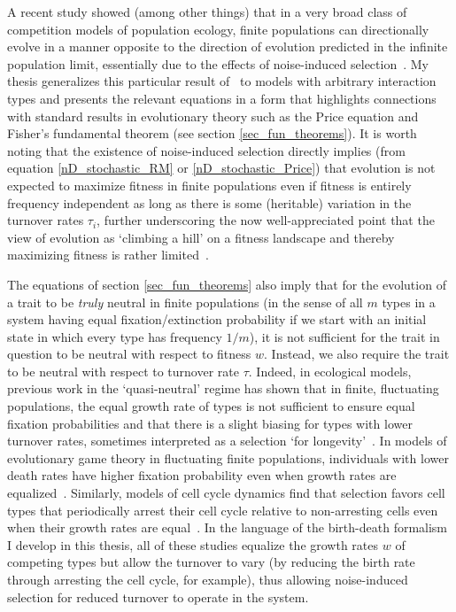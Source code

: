 A recent study showed (among other things) that in a very broad class of competition models of population ecology, finite populations can directionally evolve in a manner opposite to the direction of evolution predicted in the infinite population limit, essentially due to the effects of noise-induced selection~\citep{mazzolini_universality_2022}. My thesis generalizes this particular result of~\citet{mazzolini_universality_2022} to models with arbitrary interaction types and presents the relevant equations in a form that highlights connections with standard results in evolutionary theory such as the Price equation and Fisher's fundamental theorem (see section \ref{sec_fun_theorems}). It is worth noting that the existence of noise-induced selection directly implies (from equation \eqref{nD_stochastic_RM} or \eqref{nD_stochastic_Price}) that evolution is not expected to maximize fitness in finite populations even if fitness is entirely frequency independent as long as there is some (heritable) variation in the turnover rates $\tau_i$, further underscoring the now well-appreciated point that the view of evolution as `climbing a hill' on a fitness landscape and thereby maximizing fitness is rather limited~\citep{grodwohl_theory_2017}.

The equations of section \ref{sec_fun_theorems} also imply that for the evolution of a trait to be \emph{truly} neutral in finite populations (in the sense of all $m$ types in a system having equal fixation/extinction probability if we start with an initial state in which every type has frequency $1/m$), it is not sufficient for the trait in question to be neutral with respect to fitness $w$. Instead, we also require the trait to be neutral with respect to turnover rate $\tau$. Indeed, in ecological models, previous work in the `quasi-neutral' regime has shown that in finite, fluctuating populations, the equal growth rate of types is not sufficient to ensure equal fixation probabilities and that there is a slight biasing for types with lower turnover rates, sometimes interpreted as a selection `for longevity'~\citep{lin_features_2012, oliveira_advantage_2017,balasekaran_quasi-neutral_2022}. In models of evolutionary game theory in fluctuating finite populations, individuals with lower death rates have higher fixation probability even when growth rates are equalized~\citep{huang_stochastic_2015, czuppon_fixation_2018}. Similarly, models of cell cycle dynamics find that selection favors cell types that periodically arrest their cell cycle relative to non-arresting cells even when their growth rates are equal~\citep{wodarz_effect_2017}. In the language of the birth-death formalism I develop in this thesis, all of these studies equalize the growth rates $w$ of competing types but allow the turnover to vary (by reducing the birth rate through arresting the cell cycle, for example), thus allowing noise-induced selection for reduced turnover to operate in the system.


